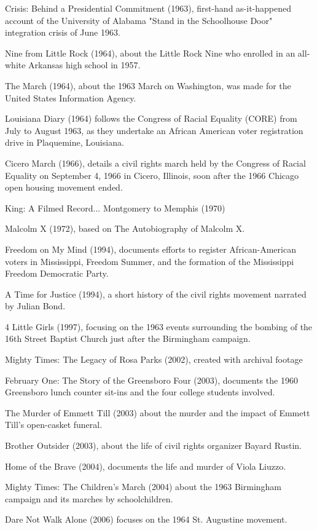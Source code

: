 Crisis: Behind a Presidential Commitment (1963), first-hand
as-it-happened account of the University of Alabama "Stand in the
Schoolhouse Door" integration crisis of June 1963.

Nine from Little Rock (1964), about the Little Rock Nine who enrolled in
an all-white Arkansas high school in 1957.

The March (1964), about the 1963 March on Washington, was made for the
United States Information Agency.

Louisiana Diary (1964) follows the Congress of Racial Equality (CORE)
from July to August 1963, as they undertake an African American voter
registration drive in Plaquemine, Louisiana.

Cicero March (1966), details a civil rights march held by the Congress
of Racial Equality on September 4, 1966 in Cicero, Illinois, soon after
the 1966 Chicago open housing movement ended.

King: A Filmed Record... Montgomery to Memphis (1970)

Malcolm X (1972), based on The Autobiography of Malcolm X.

Freedom on My Mind (1994), documents efforts to register
African-American voters in Mississippi, Freedom Summer, and the
formation of the Mississippi Freedom Democratic Party.

A Time for Justice (1994), a short history of the civil rights movement
narrated by Julian Bond.

4 Little Girls (1997), focusing on the 1963 events surrounding the
bombing of the 16th Street Baptist Church just after the Birmingham
campaign.

Mighty Times: The Legacy of Rosa Parks (2002), created with archival
footage

February One: The Story of the Greensboro Four (2003), documents the
1960 Greensboro lunch counter sit-ins and the four college students
involved.

The Murder of Emmett Till (2003) about the murder and the impact of
Emmett Till's open-casket funeral.

Brother Outsider (2003), about the life of civil rights organizer Bayard
Rustin.

Home of the Brave (2004), documents the life and murder of Viola Liuzzo.

Mighty Times: The Children's March (2004) about the 1963 Birmingham
campaign and its marches by schoolchildren.

Dare Not Walk Alone (2006) focuses on the 1964 St. Augustine movement.

